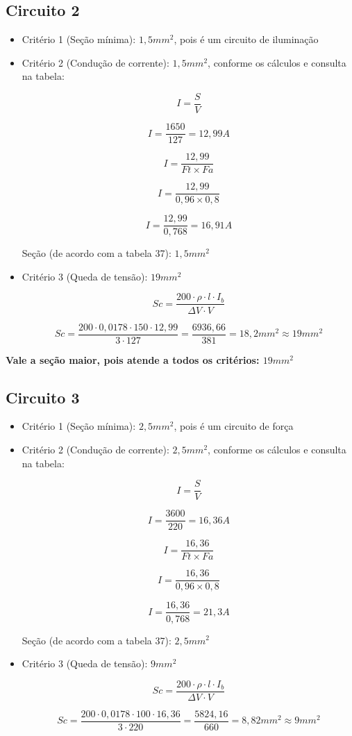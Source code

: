 \documentclass{article}
\begin{document}
\subsection{Circuito 2}
\begin{itemize}
\item Critério 1 (Seção mínima): $1,5mm^2$, pois é um circuito de iluminação
\item Critério 2 (Condução de corrente): $1,5mm^2$, conforme os cálculos e consulta na tabela:

\[I = \frac{S}{V}\]

\[I = \frac{1650}{127} = 12,99 A\]

\[I = \frac{12,99}{Ft\times Fa}\]

\[I = \frac{12,99}{0,96\times 0,8}\]

\[I = \frac{12,99}{0,768} = 16,91 A\]

Seção (de acordo com a tabela 37): $1,5mm^2$

\item Critério 3 (Queda de tensão): $19mm^2$

\[Sc = \frac{200\cdot \rho\cdot l\cdot I_{b}}{\Delta V\cdot V}\]

        \[Sc = \frac{200\cdot 0,0178\cdot 150\cdot 12,99}{3\cdot 127} = \frac{6936,66}{381} = 18,2mm^2 \approx 19mm^2\]
\end{itemize}

\textbf{Vale a seção maior, pois atende a todos os critérios: $19mm^2$}

\subsection{Circuito 3}

\begin{itemize}
\item Critério 1 (Seção mínima): $2,5mm^2$, pois é um circuito de força
\item Critério 2 (Condução de corrente): $2,5mm^2$, conforme os cálculos e consulta na tabela:

\[I = \frac{S}{V}\]

\[I = \frac{3600}{220} = 16,36 A\]

\[I = \frac{16,36}{Ft\times Fa}\]

\[I = \frac{16,36}{0,96\times 0,8}\]

\[I = \frac{16,36}{0,768} = 21,3 A\]

Seção (de acordo com a tabela 37): $2,5mm^2$

\item Critério 3 (Queda de tensão): $9mm^2$

\[Sc = \frac{200\cdot \rho\cdot l\cdot I_{b}}{\Delta V\cdot V}\]

\[Sc = \frac{200\cdot 0,0178\cdot 100\cdot 16,36}{3\cdot 220} = \frac{5824,16}{660} = 8,82mm^2 \approx 9mm^2\]
\end{itemize}
\end{document}
